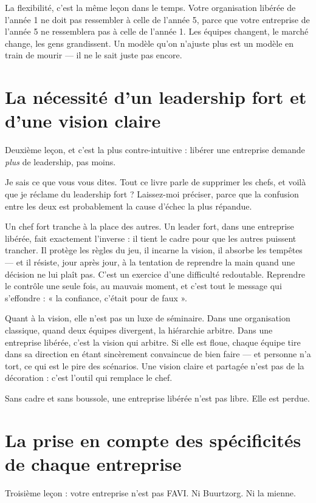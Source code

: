 La flexibilité, c'est la même leçon dans le temps. Votre organisation libérée de l'année 1 ne doit pas ressembler à celle de l'année 5, parce que votre entreprise de l'année 5 ne ressemblera pas à celle de l'année 1. Les équipes changent, le marché change, les gens grandissent. Un modèle qu'on n'ajuste plus est un modèle en train de mourir — il ne le sait juste pas encore.


\section{La nécessité d'un leadership fort et d'une vision claire}

Deuxième leçon, et c'est la plus contre-intuitive : libérer une entreprise demande \emph{plus} de leadership, pas moins.

Je sais ce que vous vous dites. Tout ce livre parle de supprimer les chefs, et voilà que je réclame du leadership fort ? Laissez-moi préciser, parce que la confusion entre les deux est probablement la cause d'échec la plus répandue.

Un chef fort tranche à la place des autres. Un leader fort, dans une entreprise libérée, fait exactement l'inverse : il tient le cadre pour que les autres puissent trancher. Il protège les règles du jeu, il incarne la vision, il absorbe les tempêtes — et il résiste, jour après jour, à la tentation de reprendre la main quand une décision ne lui plaît pas. C'est un exercice d'une difficulté redoutable. Reprendre le contrôle une seule fois, au mauvais moment, et c'est tout le message qui s'effondre : « la confiance, c'était pour de faux ».

Quant à la vision, elle n'est pas un luxe de séminaire. Dans une organisation classique, quand deux équipes divergent, la hiérarchie arbitre. Dans une entreprise libérée, c'est la vision qui arbitre. Si elle est floue, chaque équipe tire dans sa direction en étant sincèrement convaincue de bien faire — et personne n'a tort, ce qui est le pire des scénarios. Une vision claire et partagée n'est pas de la décoration : c'est l'outil qui remplace le chef.

Sans cadre et sans boussole, une entreprise libérée n'est pas libre. Elle est perdue.

\section{La prise en compte des spécificités de chaque entreprise}

Troisième leçon : votre entreprise n'est pas FAVI. Ni Buurtzorg. Ni la mienne.

